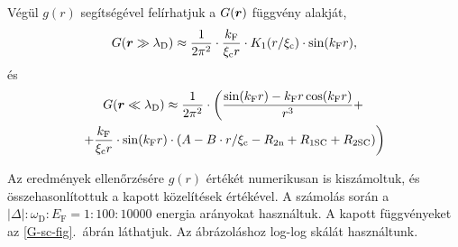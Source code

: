 \documentclass[a4paper,12pt,titlepage]{article}
\newcommand{\RR}{{\vb*{r}}}
\newcommand{\kF}{{k_\text{F}}}
\newcommand{\EF}{{E_\text{F}}}
\begin{document}
Végül $g(r)$ segítségével felírhatjuk a $G(\RR)$ függvény alakját,
\begin{equation}
	G(\RR \gg \lambda_\text{D}) \approx \frac{1}{2 \pi^2} \cdot \frac{\kF}{\xi_\text{c} r} \cdot K_1(r / \xi_\text{c}) \cdot \sin(\kF r),
\end{equation}
és
\begin{multline}
	G(\RR \ll \lambda_\text{D}) \approx \frac{1}{2 \pi^2} \cdot \left( \frac{\sin(\kF r) - \kF r \cos(\kF r)}{r^3} +
	\right. \\ \left. +
	\frac{\kF}{\xi_\text{c} r} \cdot \sin(\kF r) \cdot \left( A - B \cdot r / \xi_\text{c} - R_{2 \text{n}} + R_{1 \text{SC}} + R_{2 \text{SC}} \right) \right)
\end{multline}

Az eredmények ellenőrzésére $g(r)$ értékét numerikusan is kiszámoltuk, és összehasonlítottuk a kapott közelítések értékével.  A számolás során a $\left| \Delta \right| : \omega_\text{D} : \EF = 1 : 100 : 10000$ energia arányokat használtuk.  A kapott függvényeket az \ref{G-sc-fig}.\ ábrán láthatjuk.  Az ábrázoláshoz log-log skálát használtunk.
\end{document}
